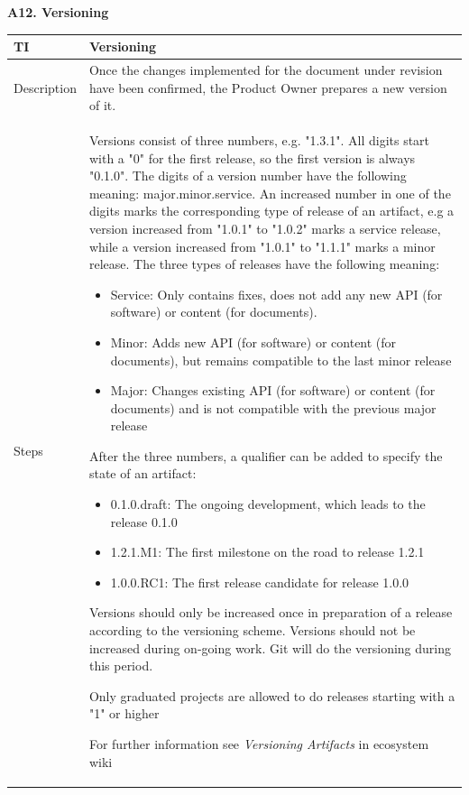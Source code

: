\documentclass{template/openetcs_article}
\begin{document}
\textbf{A12. Versioning}

\begin{flushleft}
\tablefirsthead{}
\tablehead{}
\tabletail{}
\tablelasttail{}
\begin{supertabular}{|m{2cm}|m{13cm}|}
\hline
{}
TI & 
Versioning
\\\hline
Description &
Once the changes implemented for the document under revision have been confirmed, the Product Owner prepares a new version of it.
\\\hline
Steps &
Versions consist of three numbers, e.g. "1.3.1". All digits start with a "0" for the first release, so the first version is always "0.1.0". The digits of a version number have the following meaning: major.minor.service. An increased number in one of the digits marks the corresponding type of release of an artifact, e.g a version increased from "1.0.1" to "1.0.2" marks a service release, while a version increased from "1.0.1" to "1.1.1" marks a minor release. The three types of releases have the following meaning:
\begin{itemize}
\item Service: Only contains fixes, does not add any new API (for software) or content (for documents).
\item Minor: Adds new API (for software) or content (for documents), but remains compatible to the last minor release
\item Major: Changes existing API (for software) or content (for documents) and is not compatible with the previous major release
\end{itemize}
After the three numbers, a qualifier can be added to specify the state of an artifact:
\begin{itemize}
\item 0.1.0.draft: The ongoing development, which leads to the release 0.1.0
\item 1.2.1.M1: The first milestone on the road to release 1.2.1
\item 1.0.0.RC1: The first release candidate for release 1.0.0
\end{itemize}
Versions should only be increased once in preparation of a release according to the versioning scheme. Versions should not be increased during on-going work. Git will do the versioning during this period.

Only graduated projects are allowed to do releases starting with a "1" or higher

For further information see {\it Versioning Artifacts} in ecosystem wiki
\\\hline
\end{supertabular}
\end{flushleft}
\end{document}
